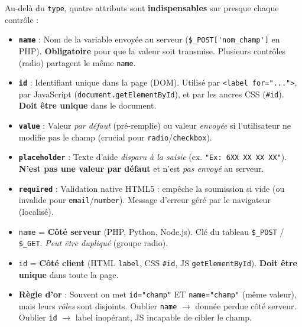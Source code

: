 \documentclass[11pt]{article}
\newcommand{\cle}[1]{{\popxbold\color{popdark}#1}}
\begin{document}
Au-delà du \texttt{type}, quatre attributs sont \textbf{indispensables} sur presque chaque contrôle :

\begin{propriete}
\begin{itemize}
    \item \textbf{\texttt{name}} : \cle{Nom de la variable} envoyée au serveur (\verb|$_POST['nom_champ']| en PHP). \textbf{Obligatoire} pour que la valeur soit transmise. Plusieurs contrôles (radio) partagent le même \texttt{name}.
    \item \textbf{\texttt{id}} : \cle{Identifiant unique} dans la page (DOM). Utilisé par \texttt{<label for="...">}, par JavaScript (\texttt{document.getElementById}), et par les ancres CSS (\texttt{\#id}). \textbf{Doit être unique} dans le document.
    \item \textbf{\texttt{value}} : Valeur \emph{par défaut} (pré-remplie) ou valeur \emph{envoyée} si l'utilisateur ne modifie pas le champ (crucial pour \texttt{radio}/\texttt{checkbox}).
    \item \textbf{\texttt{placeholder}} : Texte d'aide \emph{disparu à la saisie} (ex. \texttt{"Ex: 6XX XX XX XX"}). \textbf{N'est pas une valeur par défaut} et n'est \emph{pas envoyé} au serveur.
    \item \textbf{\texttt{required}} : Validation native HTML5 : empêche la soumission si vide (ou invalide pour \texttt{email}/\texttt{number}). Message d'erreur géré par le navigateur (localisé).
\end{itemize}
\end{propriete}

\begin{attention}
\begin{itemize}
    \item \texttt{name} = \textbf{Côté serveur} (PHP, Python, Node.js). Clé du tableau \verb|$_POST| / \verb|$_GET|. \emph{Peut être dupliqué} (groupe radio).
    \item \texttt{id} = \textbf{Côté client} (HTML \texttt{label}, CSS \texttt{\#id}, JS \texttt{getElementById}). \textbf{Doit être unique} dans toute la page.
    \item \textbf{Règle d'or} : Souvent on met \texttt{id="champ"} ET \texttt{name="champ"} (même valeur), mais leurs \emph{rôles} sont disjoints. Oublier \texttt{name} $\rightarrow$ donnée perdue côté serveur. Oublier \texttt{id} $\rightarrow$ label inopérant, JS incapable de cibler le champ.
\end{itemize}
\end{attention}
\end{document}
